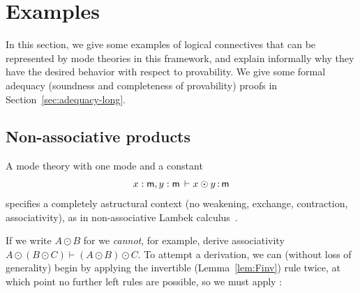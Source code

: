 
\newcommand\truej[1]{#1 \,\, \dsd{true}}
\newcommand\possj[1]{#1 \,\, \dsd{poss}}
\newcommand\validj[1]{#1 \,\, \dsd{valid}}
\newcommand\crispj[1]{#1 \,\, \dsd{crisp}}
\newcommand\cohesivej[1]{#1 \,\, \dsd{coh}}

\section{Examples}
\label{sec:exampleencodings}

In this section, we give some examples of logical connectives that can
be represented by mode theories in this framework, and explain
informally why they have the desired behavior with respect to
provability.  We give some formal adequacy (soundness and completeness
of provability) proofs in Section~\ref{sec:adequacy-long}.


\subsection{Non-associative products}

A mode theory with one mode  and a constant
\[
\begin{array}{c}
x : \mathsf{m}, y : \mathsf{m} \, \vdash x \odot y \, \mathit{:} \, \mathsf{m}\\
\end{array}
\]
specifies a completely astructural context (no weakening, exchange,
contraction, associativity), as in non-associative Lambek
calculus~\citep{lambek58calculus}.  

If we write $A \odot B$ for  we \emph{cannot}, for
example, derive associativity $A \odot (B \odot C) \vdash (A \odot B)
\odot C$.  To attempt a derivation, we can (without loss of generality)
begin by applying the invertible (Lemma~\ref{lem:Finv}) \FL\/ rule
twice, at which point no further left rules are possible, so we must apply \FR:

